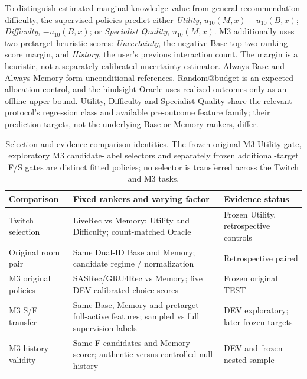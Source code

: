 To distinguish estimated marginal knowledge value from general recommendation difficulty, the supervised policies predict either \emph{Utility}, $u_{10}(M,x)-u_{10}(B,x)$; \emph{Difficulty}, $-u_{10}(B,x)$; or \emph{Specialist Quality}, $u_{10}(M,x)$. M3 additionally uses two pretarget heuristic scores: \emph{Uncertainty}, the negative Base top-two ranking-score margin, and \emph{History}, the user's previous interaction count. The margin is a heuristic, not a separately calibrated uncertainty estimator. Always Base and Always Memory form unconditional references. Random@budget is an expected-allocation control, and the hindsight Oracle uses realized outcomes only as an offline upper bound. Utility, Difficulty and Specialist Quality share the relevant protocol's regression class and available pre-outcome feature family; their prediction targets, not the underlying Base or Memory rankers, differ.

\begin{table}[t]
\centering
\caption{Selection and evidence-comparison identities. The frozen original M3 Utility gate, exploratory M3 candidate-label selectors and separately frozen additional-target F/S gates are distinct fitted policies; no selector is transferred across the Twitch and M3 tasks.}
\label{tab:exp-methods}
\footnotesize
\setlength{\tabcolsep}{4pt}
\begin{tabularx}{\textwidth}{@{}>{\raggedright\arraybackslash}p{2.45cm}X>{\raggedright\arraybackslash}p{2.2cm}@{}}
\toprule
Comparison & Fixed rankers and varying factor & Evidence status \\
\midrule
Twitch selection & LiveRec vs Memory; Utility and Difficulty; count-matched Oracle & Frozen Utility, retrospective controls \\
Original room pair & Same Dual-ID Base and Memory; candidate regime / normalization & Retrospective paired \\
M3 original policies & SASRec/GRU4Rec vs Memory; five DEV-calibrated choice scores & Frozen original TEST \\
M3 S/F transfer & Same Base, Memory and pretarget full-active features; sampled vs full supervision labels & DEV exploratory; later frozen targets \\
M3 history validity & Same F candidates and Memory scorer; authentic versus controlled null history & DEV and frozen nested sample \\
\bottomrule
\end{tabularx}
\end{table}

